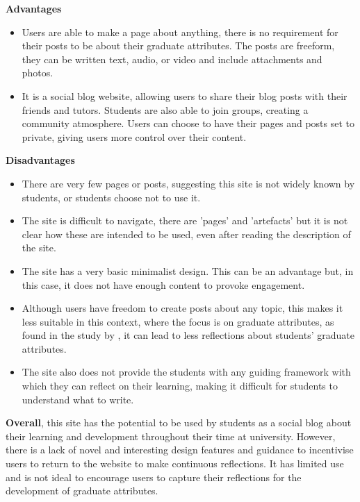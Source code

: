 \documentclass{l4proj}
\begin{document}
\textbf{Advantages}
\begin{itemize}
    \item Users are able to make a page about anything, there is no requirement for their posts to be about their graduate attributes. The posts are freeform, they can be written text, audio, or video and include attachments and photos.
    \item It is a social blog website, allowing users to share their blog posts with their friends and tutors. Students are also able to join groups, creating 
    a community atmosphere. Users can choose to have their pages and posts set to private, giving users more control over their content.
\end{itemize}

\textbf{Disadvantages}
\begin{itemize}
    \item There are very few pages or posts, suggesting this site is not widely known by students, or students choose not to use it.
    \item The site is difficult to navigate, there are 'pages' and 'artefacts' but it is not clear how these are intended to be used, even after reading the 
    description of the site. 
    \item The site has a very basic minimalist design. This can be an advantage but, in this case, it does not have enough content to provoke engagement.
    \item Although users have freedom to create posts about any topic, this makes it less suitable in this context, where the focus is on graduate attributes, as found in the study by 
    \citet{mcdermott_developing_nodate}, it can lead to less reflections about students' graduate attributes.
    \item The site also does not provide the students with any guiding framework with which they can reflect on their learning, making it difficult for students
    to understand what to write.
\end{itemize}

\textbf{Overall}, this site has the potential to be used by students as a social blog about their learning and development throughout their time at university. However, there is a lack of novel and interesting design features and guidance to incentivise users to return to the website to make continuous reflections. It has limited use and is not ideal to encourage users to capture their reflections for the development of graduate attributes.
\end{document}
